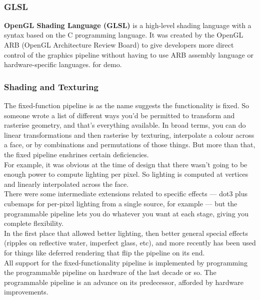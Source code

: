 \documentclass[onecolumn]{article}
\begin{document}
\\
\subsubsection{GLSL}\label{sec:2.0.5}

\begin{story}[Glsl]
\textbf{OpenGL Shading Language (GLSL) }is a high-level shading language with a syntax based on the C programming language. It was created by the OpenGL ARB (OpenGL Architecture Review Board) to give developers more direct control of the graphics pipeline without having to use ARB assembly language or hardware-specific languages.\marginnote{ } for demo.
\end{story}

\subsubsection{Shading and Texturing}\label{sec:2.0.6}\label{sec:2.0.7}
The fixed-function pipeline is as the name suggests the functionality is fixed. So someone wrote a list of different ways you'd be permitted to transform and rasterise geometry, and that's everything available. In broad terms, you can do linear transformations and then rasterise by texturing, interpolate a colour across a face, or by combinations and permutations of those things. But more than that, the fixed pipeline enshrines certain deficiencies.\\

For example, it was obvious at the time of design that there wasn't going to be enough power to compute lighting per pixel. So lighting is computed at vertices and linearly interpolated across the face.\\

There were some intermediate extensions related to specific effects — dot3 plus cubemaps for per-pixel lighting from a single source, for example — but the programmable pipeline lets you do whatever you want at each stage, giving you complete flexibility.\\

In the first place that allowed better lighting, then better general special effects (ripples on reflective water, imperfect glass, etc), and more recently has been used for things like deferred rendering that flip the pipeline on its end.\\

All support for the fixed-functionality pipeline is implemented by programming the programmable pipeline on hardware of the last decade or so. The programmable pipeline is an advance on its predecessor, afforded by hardware improvements.\\
\end{document}
